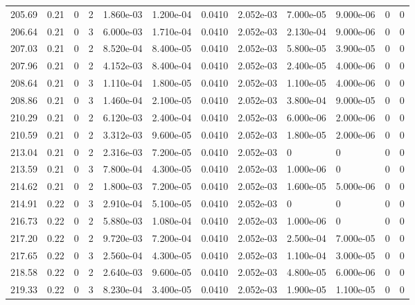 \documentclass[preview]{standalone}
\begin{document}
{{{{{{{{{\begin{tabular}{L{1.2cm}C{1.2cm} C{0.3cm}C{0.5cm} C{1.4cm}C{1.4cm} C{1.4cm}C{1.4cm} C{1.6cm}C{1.6cm} C{1.6cm}C{1.6cm}}
  205.69  &  0.21  & 0     &  2 &  1.860e-03  & 1.200e-04  &  0.0410&   2.052e-03& 7.000e-05 & 9.000e-06   &  0 & 0  \\ 
  206.64  &  0.21  & 0     &  3 &  6.000e-03  & 1.710e-04  &  0.0410&   2.052e-03& 2.130e-04 & 9.000e-06   &  0 & 0  \\ 
  207.03  &  0.21  & 0     &  2 &  8.520e-04  & 8.400e-05  &  0.0410&   2.052e-03& 5.800e-05 & 3.900e-05   &  0 & 0  \\ 
  207.96  &  0.21  & 0     &  2 &  4.152e-03  & 8.400e-04  &  0.0410&   2.052e-03& 2.400e-05 & 4.000e-06   &  0 & 0  \\ 
  208.64  &  0.21  & 0     &  3 &  1.110e-04  & 1.800e-05  &  0.0410&   2.052e-03& 1.100e-05 & 4.000e-06   &  0 & 0  \\ 
  208.86  &  0.21  & 0     &  3 &  1.460e-04  & 2.100e-05  &  0.0410&   2.052e-03& 3.800e-04 & 9.000e-05   &  0 & 0  \\ 
  210.29  &  0.21  & 0     &  2 &  6.120e-03  & 2.400e-04  &  0.0410&   2.052e-03& 6.000e-06 & 2.000e-06   &  0 & 0  \\ 
  210.59  &  0.21  & 0     &  2 &  3.312e-03  & 9.600e-05  &  0.0410&   2.052e-03& 1.800e-05 & 2.000e-06   &  0 & 0  \\ 
  213.04  &  0.21  & 0     &  2 &  2.316e-03  & 7.200e-05  &  0.0410&   2.052e-03& 0 & 0   &  0 & 0  \\ 
  213.59  &  0.21  & 0     &  3 &  7.800e-04  & 4.300e-05  &  0.0410&   2.052e-03& 1.000e-06 & 0   &  0 & 0  \\ 
  214.62  &  0.21  & 0     &  2 &  1.800e-03  & 7.200e-05  &  0.0410&   2.052e-03& 1.600e-05 & 5.000e-06   &  0 & 0  \\ 
  214.91  &  0.22  & 0     &  3 &  2.910e-04  & 5.100e-05  &  0.0410&   2.052e-03& 0 & 0   &  0 & 0  \\ 
  216.73  &  0.22  & 0     &  2 &  5.880e-03  & 1.080e-04  &  0.0410&   2.052e-03& 1.000e-06 & 0   &  0 & 0  \\ 
  217.20  &  0.22  & 0     &  2 &  9.720e-03  & 7.200e-04  &  0.0410&   2.052e-03& 2.500e-04 & 7.000e-05   &  0 & 0  \\ 
  217.65  &  0.22  & 0     &  3 &  2.560e-04  & 4.300e-05  &  0.0410&   2.052e-03& 1.100e-04 & 3.000e-05   &  0 & 0  \\ 
  218.58  &  0.22  & 0     &  2 &  2.640e-03  & 9.600e-05  &  0.0410&   2.052e-03& 4.800e-05 & 6.000e-06   &  0 & 0  \\ 
  219.33  &  0.22  & 0     &  3 &  8.230e-04  & 3.400e-05  &  0.0410&   2.052e-03& 1.900e-05 & 1.100e-05   &  0 & 0  \\ 

\end{tabular}}}}}}}}}}
\end{document}
